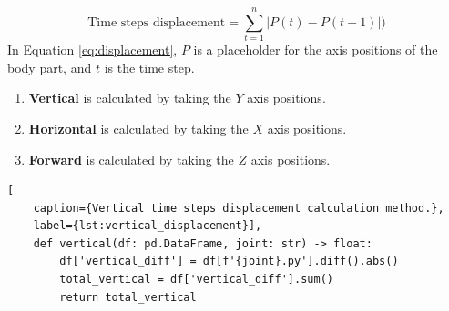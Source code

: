                 \begin{equation} \label{eq:displacement}
                    \text{Time steps displacement} = \sum_{t=1}^{n} \left| P(t) - P(t-1) \right|)
                \end{equation}
                In Equation \ref{eq:displacement}, $P$ is a placeholder for the axis positions of the body part, and $t$ is the time step. 
                \begin{enumerate}
                    \item \textbf{Vertical} is calculated by taking the $Y$ axis positions.
                    \item \textbf{Horizontal} is calculated by taking the $X$ axis positions.
                    \item \textbf{Forward} is calculated by taking the $Z$ axis positions.
                \end{enumerate}
               
        \begin{lstlisting}[
    caption={Vertical time steps displacement calculation method.}, 
    label={lst:vertical_displacement}],     
    def vertical(df: pd.DataFrame, joint: str) -> float:
        df['vertical_diff'] = df[f'{joint}.py'].diff().abs()
        total_vertical = df['vertical_diff'].sum()
        return total_vertical
        \end{lstlisting}
\cleardoublepage
